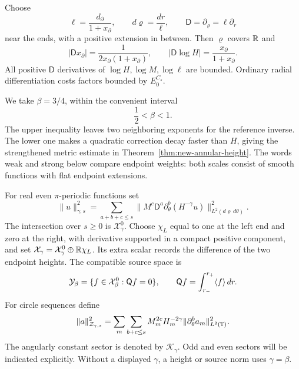 Choose
\[
 \ell=\frac{d_\partial}{1+x_\partial},\qquad
 d\varrho=\frac{dr}{\ell},\qquad \mathsf D=\partial_\varrho=\ell\partial_r
\]
near the ends, with a positive extension in between. Then
$\varrho$ covers $\mathbb R$ and
\[
 |\mathsf D x_\partial|=\frac1{2x_\partial(1+x_\partial)},\qquad
 |\mathsf D\log H|=\frac{x_\partial}{1+x_\partial}.
\]
All positive $\mathsf D$ derivatives of $\log H,\log M,\log\ell$ are
bounded. Ordinary radial differentiation costs factors bounded by
$E_0^{C_s}$.

We take $\beta=3/4$, within the convenient interval
\begin{equation}\label{eq:beta-choice}
 \frac12<\beta<1.
\end{equation}
The upper inequality leaves two neighboring exponents for the reference
inverse. The lower one makes a quadratic correction decay faster than
$H$, giving the strengthened metric estimate in
Theorem~\ref{thm:new-annular-height}.
The words weak and strong below compare endpoint weights: both
scales consist of smooth functions with flat endpoint extensions.

\begin{definition}
\label{def:readable-physical-grading}
For real even $\pi$-periodic functions set
\begin{equation}\label{eq:full-physical-norm}
 \|u\|_{\gamma,s}^2
 =\sum_{a+b+c\le s}\|M^c\mathsf D^a\partial_\theta^b
                  (H^{-\gamma}u)\|_{L^2(d\varrho\,d\theta)}^2.
\end{equation}
The intersection over $s\ge0$ is $\mathcal X^0_\gamma$.
Choose $\chi_L$ equal to one at the left end and zero at the right,
with derivative supported in a compact positive component, and set
$\mathcal X_\gamma=\mathcal X^0_\gamma\oplus\mathbb R\chi_L$.
Its extra scalar records the difference of the two endpoint heights.
The compatible source space is
\[
 \mathcal Y_\beta=\{f\in\mathcal X^0_\beta:
       \mathsf Qf=0\},\qquad
 \mathsf Qf=\int_{r_-}^{r_+}\langle f\rangle\,dr.
\]
For circle sequences define
\begin{equation}\label{eq:weak-circle-spaces}
 \|a\|_{\mathcal Z_{\gamma,s}}^2
 =\sum_m\sum_{b+c\le s}M_m^{2c}H_m^{-2\gamma}
                    \|\partial_\theta^b a_m\|_{L^2(\mathbb T)}^2.
\end{equation}
The angularly constant sector is denoted by $\mathcal K_\gamma$.
Odd and even sectors will be indicated explicitly. Without a displayed
$\gamma$, a height or source norm uses $\gamma=\beta$.
\end{definition}

